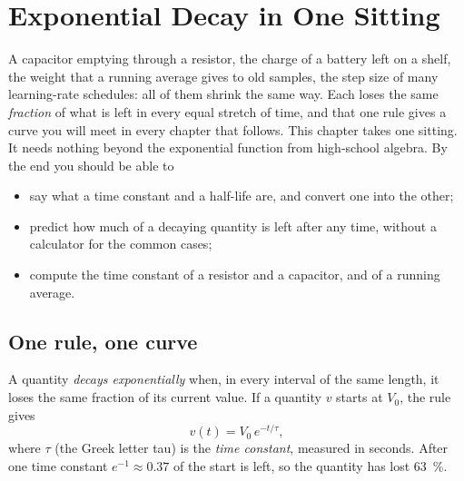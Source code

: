 \chapter{Exponential Decay in One Sitting}
\label{ch:tour}

A capacitor emptying through a resistor, the charge of a battery left on a shelf, the weight that a running
average gives to old samples, the step size of many learning-rate schedules: all of them shrink the same way. Each
loses the same \emph{fraction} of what is left in every equal stretch of time, and that one rule gives a curve you
will meet in every chapter that follows. This chapter takes one sitting. It needs nothing beyond the exponential
function from high-school algebra. By the end you should be able to

\begin{itemize}
  \item say what a time constant and a half-life are, and convert one into the other;
  \item predict how much of a decaying quantity is left after any time, without a calculator for the common cases;
  \item compute the time constant of a resistor and a capacitor, and of a running average.
\end{itemize}

\section{One rule, one curve}
\label{sec:tour-curve}

A quantity \emph{decays exponentially} when, in every interval of the same length, it loses the same fraction of
its current value. If a quantity $v$ starts at $V_0$, the rule gives
\begin{equation}
  v(t) = V_0\, e^{-t/\tau},
  \label{eq:tour-decay}
\end{equation}
where $\tau$ (the Greek letter tau) is the \emph{time constant}, measured in seconds. After one time constant
$e^{-1}\approx 0.37$ of the start is left, so the quantity has lost \qty{63}{\percent}.

